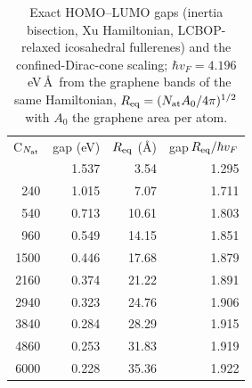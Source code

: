 \begin{table}[t]\caption{Exact HOMO--LUMO gaps (inertia bisection, Xu Hamiltonian, LCBOP-relaxed icosahedral fullerenes) and the confined-Dirac-cone scaling; $\hbar v_F=4.196$~eV\,\AA\ from the graphene bands of the same Hamiltonian, $R_{\rm eq}=(N_{\rm at} A_0/4\pi)^{1/2}$ with $A_0$ the graphene area per atom.}\label{tab:fu}\begin{ruledtabular}\begin{tabular}{rrrr}
C$_{N_{\rm at}}$ & gap (eV) & $R_{\rm eq}$ (\AA) & gap$\,R_{\rm eq}/\hbar v_F$ \\ \colrule
60 & 1.537 & 3.54 & 1.295 \\
240 & 1.015 & 7.07 & 1.711 \\
540 & 0.713 & 10.61 & 1.803 \\
960 & 0.549 & 14.15 & 1.851 \\
1500 & 0.446 & 17.68 & 1.879 \\
2160 & 0.374 & 21.22 & 1.891 \\
2940 & 0.323 & 24.76 & 1.906 \\
3840 & 0.284 & 28.29 & 1.915 \\
4860 & 0.253 & 31.83 & 1.919 \\
6000 & 0.228 & 35.36 & 1.922 \\
\end{tabular}\end{ruledtabular}\end{table}
